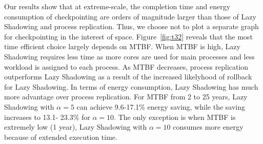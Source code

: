 Our results show that at extreme-scale, the completion time and energy consumption of checkpointing are orders of magnitude larger than those of Lazy Shadowing and process replication. Thus, we choose not to plot a separate graph for checkpointing in the interest of space. 
Figure~\ref{fig:t32} reveals that the most time efficient choice largely depends on MTBF. 
When MTBF is high, Lazy Shadowing requires less time as more cores are used for main processes and less workload is assigned to each process. As MTBF decreases, process replication outperforms Lazy Shadowing as a result of the increased likelyhood of rollback for Lazy Shadowing.
In terms of energy consumption, Lazy Shadowing has much more advantage over process replication. For MTBF from 2 to 25 years, Lazy Shadowing with $\alpha=5$ can achieve 9.6-17.1\% energy saving, while the saving increases to 13.1- 23.3\% for $\alpha=10$. The only exception is when MTBF is extremely low (1 year), Lazy Shadowing with $\alpha=10$ consumes more energy because of extended execution time.






